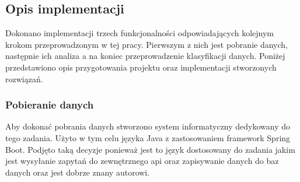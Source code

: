 \subsection{Opis implementacji}
Dokonano implementacji trzech funkcjonalności odpowiadających kolejnym krokom przeprowadzonym w tej pracy. Pierwszym z nich jest pobranie danych, następnie ich analiza a na koniec przeprowadzenie klasyfikacji danych. Poniżej przedstawiono opis przygotowania projektu oraz implementacji stworzonych rozwiązań. 
\subsubsection{Pobieranie danych}
Aby dokonać pobrania danych stworzono system informatyczny dedykowany do tego zadania. Użyto w tym celu języka Java z zastosowaniem framework Spring Boot. Podjęto taką decyzje ponieważ jest to język dostosowany do zadania jakim jest wysyłanie zapytań do zewnętrznego api oraz zapisywanie danych do baz danych oraz jest dobrze znany autorowi.

